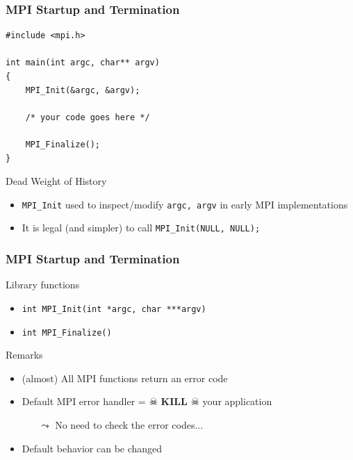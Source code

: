 \documentclass[xcolor={x11names,svgnames,psnames}]{beamer}
\begin{document}

\begin{frame}[fragile=singleslide]
  \frametitle{MPI Startup and Termination}
    
\begin{verbatim}
#include <mpi.h>

int main(int argc, char** argv)
{
    MPI_Init(&argc, &argv);

    /* your code goes here */
    
    MPI_Finalize();
}
\end{verbatim} 

\begin{block}{Dead Weight of History}
  \begin{itemize}
  \item \texttt{MPI_Init} used to inspect/modify \texttt{argc, argv} in early MPI implementations
  \item It is \alert{legal} (and simpler) to call \texttt{MPI_Init(NULL, NULL);}
  \end{itemize}
\end{block}
\end{frame}


\begin{frame}[fragile=singleslide]
  \frametitle{MPI Startup and Termination}

  \begin{exampleblock}{Library functions}
    \begin{itemize}
    \item \texttt{int MPI_Init(int *argc, char ***argv)}
    \item \texttt{int MPI_Finalize()}
    \end{itemize}
  \end{exampleblock}

  \begin{block}{Remarks}
    \begin{itemize}
    \item (almost) All MPI functions return an \alert{error code}
    \item Default MPI error handler = $\skull$ \textbf{KILL} $\skull$ your application
      \begin{itemize}
      \item[$\leadsto$] No need to check the error codes...
      \end{itemize}
    \item Default behavior can be changed
    \end{itemize}
  \end{block}
  
\end{frame}
\end{document}
